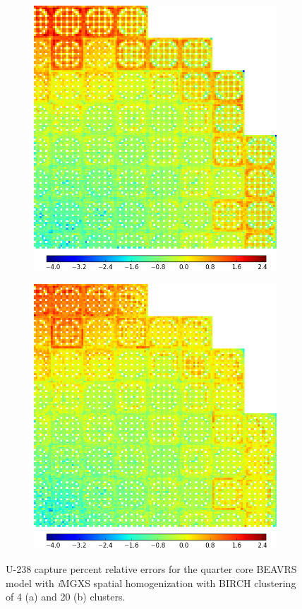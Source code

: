 \clearpage

\begin{figure}[h!]
\centering
\begin{subfigure}{0.9\textwidth}
  \centering
  \includegraphics[width=0.65\linewidth]{figures/results/spatial/full-core/capt-err-birch-4}
  \caption{}
  \label{fig:chap11-full-core-capt-err-birch-4}
\end{subfigure}
\begin{subfigure}{0.9\textwidth}
  \centering
\includegraphics[width=0.65\linewidth]{figures/results/spatial/full-core/capt-err-birch-20}
  \caption{}
  \label{fig:chap11-full-core-capt-err-birch-16}
\end{subfigure}
\caption[U-238 capture rate error spatial distributions]{U-238 capture percent relative errors for the quarter core \ac{BEAVRS} model with \textit{i}\ac{MGXS} spatial homogenization with BIRCH clustering of 4 (a) and 20 (b) clusters.}
\label{fig:chap11-full-core-capt-err-b}
\end{figure}

